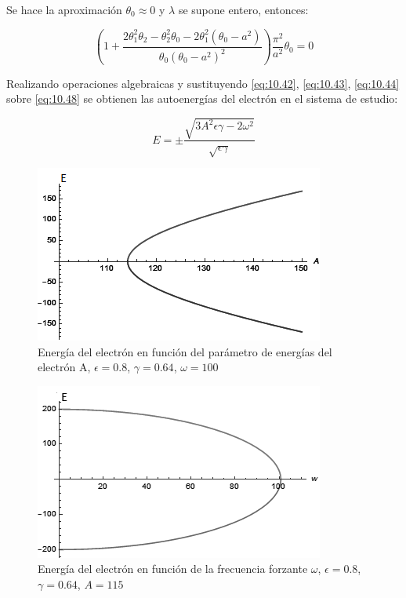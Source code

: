 Se hace la aproximación $\theta_0\approx 0$ y $\lambda$ se supone entero, entonces:

\begin{equation}\label{eq:10.48}
\left(1+\frac{2\theta_1^2\theta_2-\theta_2^2\theta_0-2\theta_1^2(\theta_0-a^2)}{\theta_0(\theta_0-a^2)^2}\right)\frac{\pi^2}{a^2}\theta_0=0
\end{equation}

Realizando operaciones algebraicas y sustituyendo \ref{eq:10.42}, \ref{eq:10.43}, \ref{eq:10.44} sobre \ref{eq:10.48} se obtienen las autoenergías del electrón en el sistema de estudio: 

\begin{equation}\label{eq:10.49}
   E=\pm \frac{\sqrt{3 A^2 \epsilon \gamma-2 \omega^2}}{\sqrt{\epsilon\gamma}}
\end{equation}

\begin{figure}[H]
    \centering
    \includegraphics[scale=1]{imagenes/esp-energia.png}
    \caption{Energía del electrón en función del parámetro de energías del electrón A, $\epsilon=0.8$, $\gamma=0.64$, $\omega=100$}
    \label{fig:10.2}
\end{figure}

\begin{figure}[H]
    \centering
    \includegraphics[scale=.8]{imagenes/ener-w.png}
    \caption{Energía del electrón en función de la frecuencia forzante $\omega$, $\epsilon=0.8$, $\gamma=0.64$, $A=115$}
    \label{fig:10.3}
\end{figure}

